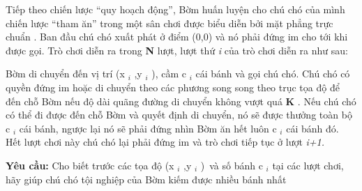 Tiếp theo chiến lược “quy hoạch động”, Bờm huấn luyện cho chú chó của mình chiến lược “tham ăn” trong một sân chơi được biểu diễn bởi mặt phẳng trực chuẩn                                                   . Ban đầu chú chó xuất phát ở điểm (0,0) và nó phải đứng im cho tới khi được gọi. Trò chơi diễn ra trong   \textbf{    N   }   lượt, lượt thứ   \emph{    i   }   của trò chơi diễn ra như sau:  

   Bờm di chuyển đến vị trí (x   $_    i   $   ,y   $_    i   $   ), cầm c   $_    i   $   cái bánh và gọi chú chó. Chú chó có quyền đứng im hoặc di chuyển theo các phương song song theo trục tọa độ để đến chỗ Bờm nếu độ dài quãng đường di chuyển không vượt quá   \textbf{    K   }   . Nếu chú chó có thể đi được đến chỗ Bờm và quyết định di chuyển, nó sẽ được thưởng toàn bộ c   $_    i   $   cái bánh, ngược lại nó sẽ phải đứng nhìn Bờm ăn hết luôn c   $_    i   $   cái bánh đó. Hết lượt chơi này chú chó lại phải đứng im và trò chơi tiếp tục ở lượt   \emph{    i+1.   }

\textbf{    Yêu cầu:   }   Cho biết trước các tọa độ (x   $_    i   $   ,y   $_    i   $   ) và số bánh c   $_    i   $   tại các lượt chơi, hãy giúp chú chó tội nghiệp của Bờm kiếm được nhiều bánh nhất